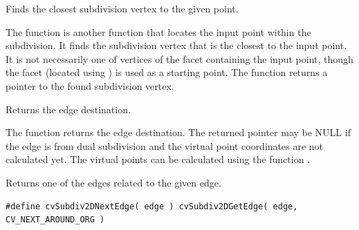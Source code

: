 Finds the closest subdivision vertex to the given point.


\begin{description}
\end{description}

The function is another function that
locates the input point within the subdivision. It finds the subdivision vertex that
is the closest to the input point. It is not necessarily one of vertices
of the facet containing the input point, though the facet (located using
) is used as a starting
point. The function returns a pointer to the found subdivision vertex.

Returns the edge destination.


\begin{description}
\end{description}

The function returns the edge destination. The
returned pointer may be NULL if the edge is from dual subdivision and
the virtual point coordinates are not calculated yet. The virtual points
can be calculated using the function .

Returns one of the edges related to the given edge.

\begin{lstlisting}
#define cvSubdiv2DNextEdge( edge ) cvSubdiv2DGetEdge( edge, CV_NEXT_AROUND_ORG )
\end{lstlisting}

